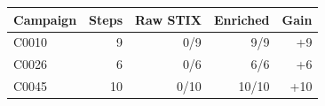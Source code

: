 \begin{tabular}{lrrrr}
\toprule
\textbf{Campaign} & \textbf{Steps} & \textbf{Raw STIX} & \textbf{Enriched} & \textbf{Gain} \\
\midrule
C0010 & 9 & 0/9 & 9/9 & +9 \\
C0026 & 6 & 0/6 & 6/6 & +6 \\
C0045 & 10 & 0/10 & 10/10 & +10 \\
\bottomrule
\end{tabular}
